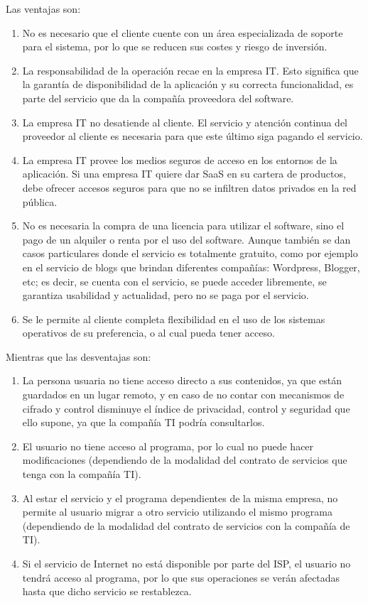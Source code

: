 \documentclass[12pt,a4paper]{article}
\begin{document}
Las ventajas son:
\begin{enumerate}

\item No es necesario que el cliente cuente con un área especializada de 
soporte para el sistema, por lo que se reducen sus costes y riesgo de 
inversión.
\item La responsabilidad de la operación recae en la empresa IT. Esto 
significa que la garantía de disponibilidad de la aplicación y su correcta 
funcionalidad, es parte del servicio que da la compañía proveedora del 
software.
\item La empresa IT no desatiende al cliente. El servicio y atención continua 
del proveedor al cliente es necesaria para que este último siga pagando el 
servicio.
\item La empresa IT provee los medios seguros de acceso en los entornos de la 
aplicación. Si una empresa IT quiere dar SaaS en su cartera de productos, 
debe ofrecer accesos seguros para que no se infiltren datos privados en la 
red pública.
\item No es necesaria la compra de una licencia para utilizar el software, 
sino el pago de un alquiler o renta por el uso del software. Aunque también 
se dan casos particulares donde el servicio es totalmente gratuito, como por 
ejemplo en el servicio de blogs que brindan diferentes compañías: Wordpress, 
Blogger, etc; es decir, se cuenta con el servicio, se puede acceder 
libremente, se garantiza usabilidad y actualidad, pero no se paga por el 
servicio.
\item Se le permite al cliente completa flexibilidad en el uso de los 
sistemas operativos de su preferencia, o al cual pueda tener acceso.

\end{enumerate}

Mientras que las desventajas son:
\begin{enumerate}

\item La persona usuaria no tiene acceso directo a sus contenidos, ya que 
están guardados en un lugar remoto, y en caso de no contar con mecanismos de 
cifrado y control disminuye el índice de privacidad, control y seguridad que 
ello supone, ya que la compañía TI podría consultarlos.
\item El usuario no tiene acceso al programa, por lo cual no puede hacer 
modificaciones (dependiendo de la modalidad del contrato de servicios que 
tenga con la compañía TI).
\item Al estar el servicio y el programa dependientes de la misma empresa, no 
permite al usuario migrar a otro servicio utilizando el mismo programa 
(dependiendo de la modalidad del contrato de servicios con la compañía de 
TI).
\item Si el servicio de Internet no está disponible por parte del ISP, el 
usuario no tendrá acceso al programa, por lo que sus operaciones se verán 
afectadas hasta que dicho servicio se restablezca.

\end{enumerate}
\end{document}
